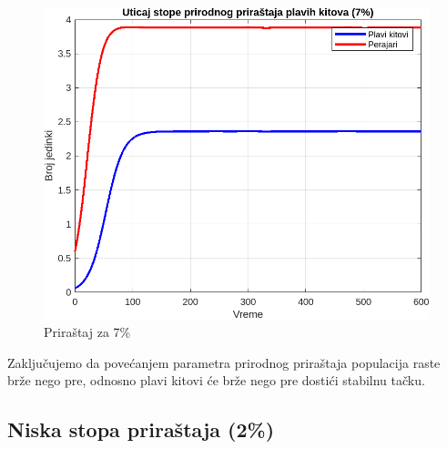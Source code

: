 \documentclass[a4paper]{article}
\begin{document}
{	\begin{figure}[h]
		\centering
		\begin{minipage}[h]{0.45\linewidth}
			\centering
			\includegraphics[width=\textwidth]{uticaj7.png}
			\caption{Priraštaj za 7\%}
			\label{slika1: pp7}
		\end{minipage}
	\end{figure}
	
	\newpage
	
	Zaključujemo da povećanjem parametra prirodnog priraštaja populacija raste brže nego pre, odnosno plavi kitovi će brže nego pre dostići stabilnu tačku.
	
	\fi 
	
	\newpage
	
	\subsection{Niska stopa priraštaja (2\%)}
	\label{sec: niska-stopa-prirastaja}
	
}
\end{document}
